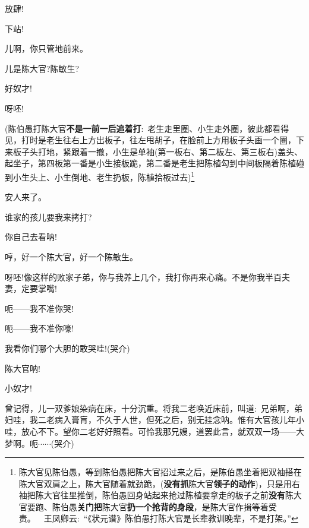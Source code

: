 {放肆!

下站!

儿啊，你只管地前来。

儿是陈大官?陈敏生?

好奴才!

呀呸!


({陈伯愚{\hwfs 打}陈大官{\bfseries\hwfs 不是一前一后追着打}}:~老生{\hwfs 走里圈}、小生{\hwfs 走外圈}，{\hwfs 彼此都看得见}，{\hwfs 打时是}老生{\hwfs 往右上方出板子}，{\hwfs 往左甩胡子}，{\hwfs 在脸前上方用板子头画一个圈}，{\hwfs 下来板子头打地}，{\hwfs 紧跟着一撤}，小生{\hwfs 是单袖}({\hwfs 第一板右}、{\hwfs 第二板左}、{\hwfs 第三板右}){\hwfs 盖头}、{\hwfs 起坐子}，{\hwfs 第四板第一番是}小生{\hwfs 接板跪}，{\hwfs 第二番是}老生{\hwfs 把}陈植{\hwfs 勾到中间板隔着}陈植{\hwfs 碰到}小生{\hwfs 头上}、小生{\hwfs 倒地}、老生{\hwfs 扔板}，陈植{\hwfs 拾板过去})\footnote{陈大官{\hwfs 见}陈伯愚，{\hwfs 等到}陈伯愚{\hwfs 把}陈大官{\hwfs 招过来之后}，{\hwfs 是}陈伯愚{\hwfs 坐着把双袖搭在}陈大官{\hwfs 双肩之上}，陈大官{\hwfs 随着就劲跪}，({\bfseries\hwfs 没有抓}陈大官{\bfseries\hwfs 领子的动作})，{\hwfs 只是用右袖把}陈大官{\hwfs 往里推倒}，陈伯愚{\hwfs 回身站起来抢过}陈植{\hwfs 要拿走的板子之前}{\bfseries\hwfs 没有}陈大官{\hwfs 要跑}、陈伯愚{\bfseries\hwfs 关门把}陈大官{\bfseries\hwfs 扔一个抢背的身段}，{\hwfs 是}陈大官{\hwfs 作揖等着受责}。~~{王凤卿云:~``{\hei 《状元谱》陈伯愚打陈大官是长辈教训晚辈，不是打架。}''}}


安人来了。

谁家的孩儿要我来拷打?

你自己去看呐!

哼，好一个陈大官，好一个陈敏生。

呀呸!像这样的败家子弟，你与我养上几个，我打你再来心痛。不是你我半百夫妻，定要掌嘴!

呃------我不准你哭!

呃------我不准你嚎!

我看你们哪个大胆的敢哭哇!({\hwfs 哭介})

陈大官呐!

小奴才!

曾记得，儿一双爹娘染病在床，十分沉重。将我二老唤近床前，叫道:~兄弟啊，弟妇哇，我二老病入膏肓，不久于人世，但死之后，别无挂念呐。惟有大官孩儿年小哇，放心不下。望你二老好好照看。可怜我那兄嫂，道罢此言，就双双一场------大梦啊。呃$\cdots{}\cdots{}$({\hwfs 哭介})

}
